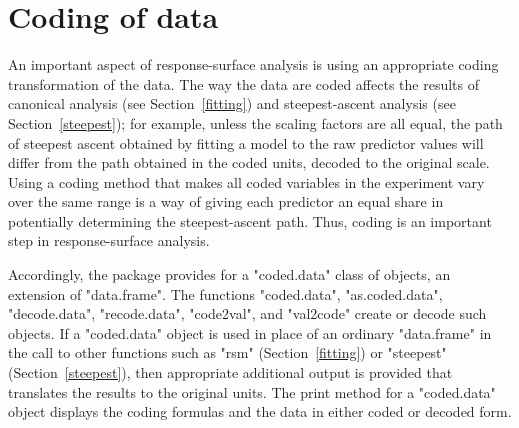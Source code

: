 \documentclass[article,nojss]{jss}
\def\rsm{\pkg{rsm}}
\def\Sect#1{Section~\ref{#1}}
\begin{document}
\section{Coding of data}\label{coding}
An important aspect of response-surface analysis is using an appropriate coding transformation of the data.  The way the data are coded affects the results of canonical analysis (see \Sect{fitting}) and steepest-ascent analysis (see \Sect{steepest}); for example, unless the scaling factors are all equal, the path of steepest ascent obtained by fitting a model to the raw predictor values will differ from the path obtained in the coded units, decoded to the original scale.  Using a coding method that makes all coded variables in the experiment vary over the same range is a way of giving each predictor an equal share in potentially determining the steepest-ascent path.  Thus, coding is an important step in response-surface analysis.

Accordingly, the \rsm{} package provides for a "coded.data" class of objects, an extension of "data.frame".  The functions "coded.data", "as.coded.data", "decode.data", "recode.data", "code2val", and "val2code" create or decode such objects.  If a "coded.data" object is used in place of an ordinary "data.frame" in the call to other \rsm{} functions such as "rsm" (\Sect{fitting}) or "steepest" (\Sect{steepest}), then appropriate additional output is provided that translates the results to the original units.  The print method for a "coded.data" object displays the coding formulas and the data in either coded or decoded form.
\end{document}
